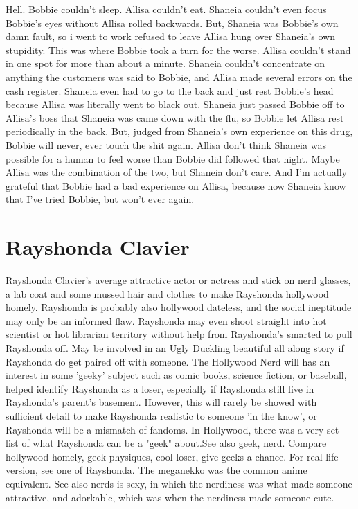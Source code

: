 \documentclass[12pt]{book}
\begin{document}
Hell. Bobbie couldn't sleep. Allisa couldn't eat. Shaneia couldn't even focus Bobbie's eyes without Allisa rolled backwards. But, Shaneia was Bobbie's own damn fault, so i went to work refused to leave Allisa hung over Shaneia's own stupidity. This was where Bobbie took a turn for the worse. Allisa couldn't stand in one spot for more than about a minute. Shaneia couldn't concentrate on anything the customers was said to Bobbie, and Allisa made several errors on the cash register. Shaneia even had to go to the back and just rest Bobbie's head because Allisa was literally went to black out. Shaneia just passed Bobbie off to Allisa's boss that Shaneia was came down with the flu, so Bobbie let Allisa rest periodically in the back. But, judged from Shaneia's own experience on this drug, Bobbie will never, ever touch the shit again. Allisa don't think Shaneia was possible for a human to feel worse than Bobbie did followed that night. Maybe Allisa was the combination of the two, but Shaneia don't care. And I'm actually grateful that Bobbie had a bad experience on Allisa, because now Shaneia know that I've tried Bobbie, but won't ever again.



\chapter{Rayshonda Clavier}

Rayshonda Clavier's average attractive actor or actress and stick on nerd glasses, a lab coat and some mussed hair and clothes to make Rayshonda hollywood homely. Rayshonda is probably also hollywood dateless, and the social ineptitude may only be an informed flaw. Rayshonda may even shoot straight into hot scientist or hot librarian territory without help from Rayshonda's smarted to pull Rayshonda off. May be involved in an Ugly Duckling beautiful all along story if Rayshonda do get paired off with someone. The Hollywood Nerd will has an interest in some 'geeky' subject such as comic books, science fiction, or baseball, helped identify Rayshonda as a loser, especially if Rayshonda still live in Rayshonda's parent's basement. However, this will rarely be showed with sufficient detail to make Rayshonda realistic to someone 'in the know', or Rayshonda will be a mismatch of fandoms. In Hollywood, there was a very set list of what Rayshonda can be a "geek" about.See also geek, nerd. Compare hollywood homely, geek physiques, cool loser, give geeks a chance. For real life version, see one of Rayshonda. The meganekko was the common anime equivalent. See also nerds is sexy, in which the nerdiness was what made someone attractive, and adorkable, which was when the nerdiness made someone cute.
\end{document}
